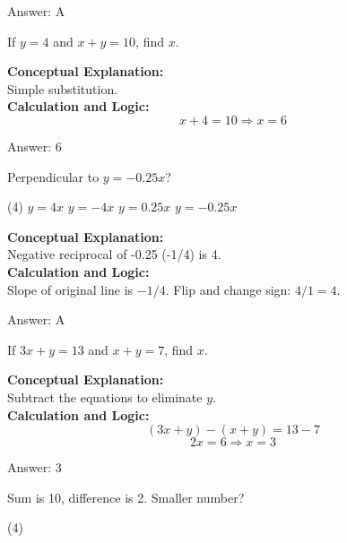 \documentclass[11pt,paper=a4,answers]{exam}
\begin{document}
\begin{questions}
\begin{solution}
\vspace{15pt}
Answer: \colorbox{yellow!100}{A}
\end{solution}

\question
If $y = 4$ and $x + y = 10$, find $x$.

\begin{solution}
\textbf{Conceptual Explanation:} \\
Simple substitution.
\\[10pt]
\textbf{Calculation and Logic:} \\
\[x + 4 = 10 \Rightarrow x = 6\]

\vspace{15pt}
Answer: \colorbox{yellow!100}{6}
\end{solution}

\question
Perpendicular to $y = -0.25x$?
\begin{tasks}(4)
    \task $y = 4x$
    \task $y = -4x$
    \task $y = 0.25x$
    \task $y = -0.25x$
\end{tasks}

\begin{solution}
\textbf{Conceptual Explanation:} \\
Negative reciprocal of -0.25 (-1/4) is 4.
\\[10pt]
\textbf{Calculation and Logic:} \\
Slope of original line is $-1/4$. Flip and change sign: $4/1 = 4$.

\vspace{15pt}
Answer: \colorbox{yellow!100}{A}
\end{solution}

\question
If $3x + y = 13$ and $x + y = 7$, find $x$.

\begin{solution}
\textbf{Conceptual Explanation:} \\
Subtract the equations to eliminate $y$.
\\[10pt]
\textbf{Calculation and Logic:} \\
\[(3x + y) - (x + y) = 13 - 7\]
\[2x = 6 \Rightarrow x = 3\]

\vspace{15pt}
Answer: \colorbox{yellow!100}{3}
\end{solution}

\question
Sum is 10, difference is 2. Smaller number?
\begin{tasks}(4)
\end{tasks}


\end{questions}
\end{document}

